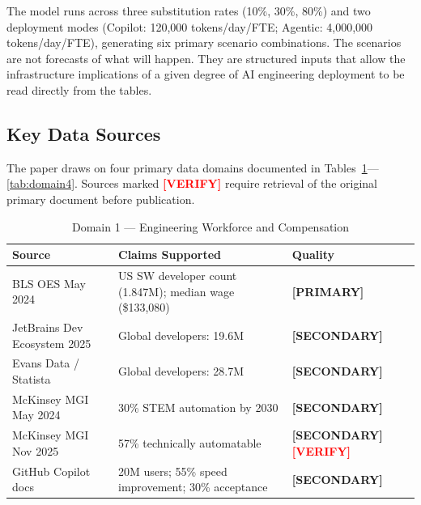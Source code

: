 \documentclass{article}
\newcommand{\PRIMARY}{\textbf{[PRIMARY]}}
\newcommand{\SECONDARY}{\textbf{[SECONDARY]}}
\newcommand{\VERIFY}{\textcolor{red}{\textbf{[VERIFY]}}}
\begin{document}
The model runs across three substitution rates (10\%, 30\%, 80\%) and two deployment
modes (Copilot: 120,000 tokens/day/FTE; Agentic: 4,000,000 tokens/day/FTE), generating
six primary scenario combinations. The scenarios are not forecasts of what will happen.
They are structured inputs that allow the infrastructure implications of a given degree of
AI engineering deployment to be read directly from the tables.

\subsection{Key Data Sources}
\label{sec:data-sources}

The paper draws on four primary data domains documented in Tables~\ref{tab:domain1}---%
\ref{tab:domain4}. Sources marked \VERIFY{} require retrieval of the original primary
document before publication.

\begin{table}[ht]
\centering
\caption{Domain 1 --- Engineering Workforce and Compensation}
\label{tab:domain1}
\small
\begin{tabular}{@{}p{4.5cm}p{3.5cm}p{1.5cm}@{}}
\toprule
\textbf{Source} & \textbf{Claims Supported} & \textbf{Quality} \\
\midrule
BLS OES May 2024 & US SW developer count (1.847M); median wage (\$133,080) & \PRIMARY{} \\
JetBrains Dev Ecosystem 2025 & Global developers: 19.6M & \SECONDARY{} \\
Evans Data / Statista & Global developers: 28.7M & \SECONDARY{} \\
McKinsey MGI May 2024 & 30\% STEM automation by 2030 & \SECONDARY{} \\
McKinsey MGI Nov 2025 & 57\% technically automatable & \SECONDARY{} \VERIFY{} \\
GitHub Copilot docs & 20M users; 55\% speed improvement; 30\% acceptance & \SECONDARY{} \\
\bottomrule
\end{tabular}
\end{table}
\end{document}
